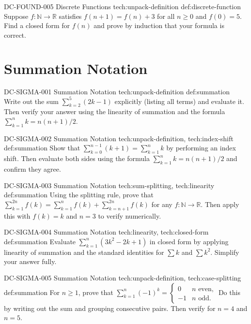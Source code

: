 \exstubgenfull
  {DC-FOUND-005}
  {Discrete Functions}
  {tech:unpack-definition}
  {def:discrete-function}
  {Suppose \(f : \mathbb{N} \to \mathbb{R}\) satisfies \(f(n+1) = f(n) + 3\)
  for all \(n \ge 0\) and \(f(0) = 5\). Find a closed form for \(f(n)\)
  and prove by induction that your formula is correct.}

\section*{Summation Notation}

\exstubgenfull
  {DC-SIGMA-001}
  {Summation Notation}
  {tech:unpack-definition}
  {def:summation}
  {Write out the sum \(\displaystyle\sum_{k=2}^{5}(2k-1)\) explicitly
  (listing all terms) and evaluate it. Then verify your answer using
  the linearity of summation and the formula \(\sum_{k=1}^{n} k = n(n+1)/2\).}

\exstubgenfull
  {DC-SIGMA-002}
  {Summation Notation}
  {tech:unpack-definition, tech:index-shift}
  {def:summation}
  {Show that \(\displaystyle\sum_{k=0}^{n-1}(k+1) = \sum_{k=1}^{n} k\)
  by performing an index shift. Then evaluate both sides using the formula
  \(\sum_{k=1}^{n} k = n(n+1)/2\) and confirm they agree.}

\exstubgenfull
  {DC-SIGMA-003}
  {Summation Notation}
  {tech:sum-splitting, tech:linearity}
  {def:summation}
  {Using the splitting rule, prove that
  \(\displaystyle\sum_{k=1}^{2n} f(k) = \sum_{k=1}^{n} f(k) + \sum_{k=n+1}^{2n} f(k)\)
  for any \(f : \mathbb{N} \to \mathbb{R}\). Then apply this with
  \(f(k) = k\) and \(n = 3\) to verify numerically.}

\exstubgenfull
  {DC-SIGMA-004}
  {Summation Notation}
  {tech:linearity, tech:closed-form}
  {def:summation}
  {Evaluate \(\displaystyle\sum_{k=1}^{n}(3k^2 - 2k + 1)\) in closed form
  by applying linearity of summation and the standard identities for
  \(\sum k\) and \(\sum k^2\). Simplify your answer fully.}

\exstubgenfull
  {DC-SIGMA-005}
  {Summation Notation}
  {tech:unpack-definition, tech:case-splitting}
  {def:summation}
  {For \(n \ge 1\), prove that
  \(\displaystyle\sum_{k=1}^{n}(-1)^k =
  \begin{cases} 0 & n \text{ even,} \\ -1 & n \text{ odd.} \end{cases}\)
  Do this by writing out the sum and grouping consecutive pairs.
  Then verify for \(n = 4\) and \(n = 5\).}

